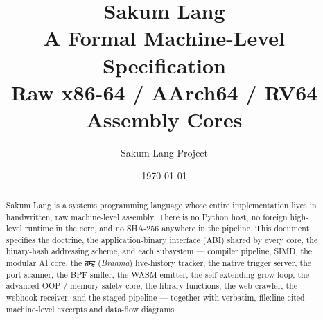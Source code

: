\documentclass[11pt,a4paper]{article}
\title{\bfseries Sakum Lang\\
       \Large A Formal Machine-Level Specification\\
       \normalsize Raw x86-64 / AArch64 / RV64 Assembly Cores}
\author{Sakum Lang Project}
\date{\today}
\begin{document}
\maketitle

\begin{abstract}
Sakum Lang is a systems programming language whose entire implementation
lives in handwritten, raw machine-level assembly.  There is no Python host,
no foreign high-level runtime in the core, and no SHA-256 anywhere in the
pipeline.  This document specifies the doctrine, the application-binary
interface (ABI) shared by every core, the binary-hash addressing scheme,
and each subsystem --- compiler pipeline, SIMD, the modular AI core, the
ब्रम्ह (\emph{Brahma}) live-history tracker, the native trigger server, the
port scanner, the BPF sniffer, the WASM emitter, the self-extending grow
loop, the advanced OOP / memory-safety core, the library functions, the web
crawler, the webhook receiver, and the staged pipeline --- together with
verbatim, file:line-cited machine-level excerpts and data-flow diagrams.
\end{abstract}

\tableofcontents
\newpage


















\end{document}
